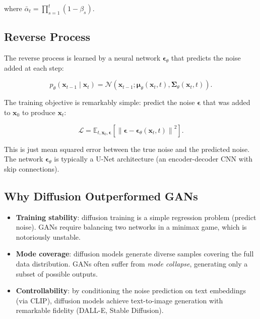 \documentclass[12pt]{article}
\begin{document}
where $\bar{\alpha}_t = \prod_{s=1}^t (1 - \beta_s)$.

\subsection{Reverse Process}

The reverse process is learned by a neural network $\boldsymbol{\epsilon}_\theta$ that predicts the noise added at each step:

\begin{equation}
    p_\theta(\mathbf{x}_{t-1} \mid \mathbf{x}_t) = \mathcal{N}(\mathbf{x}_{t-1}; \boldsymbol{\mu}_\theta(\mathbf{x}_t, t), \boldsymbol{\Sigma}_\theta(\mathbf{x}_t, t)).
    \label{t13eq:reverse}
\end{equation}

The training objective is remarkably simple: predict the noise $\boldsymbol{\epsilon}$ that was added to $\mathbf{x}_0$ to produce $\mathbf{x}_t$:

\begin{equation}
    \mathcal{L} = \mathbb{E}_{t, \mathbf{x}_0, \boldsymbol{\epsilon}} \left[ \left\| \boldsymbol{\epsilon} - \boldsymbol{\epsilon}_\theta(\mathbf{x}_t, t) \right\|^2 \right].
    \label{t13eq:diffusion_loss}
\end{equation}

This is just mean squared error between the true noise and the predicted noise. The network $\boldsymbol{\epsilon}_\theta$ is typically a U-Net architecture (an encoder-decoder CNN with skip connections).

\subsection{Why Diffusion Outperformed GANs}

\begin{itemize}
    \item \textbf{Training stability}: diffusion training is a simple regression problem (predict noise). GANs require balancing two networks in a minimax game, which is notoriously unstable.
    \item \textbf{Mode coverage}: diffusion models generate diverse samples covering the full data distribution. GANs often suffer from \textit{mode collapse}, generating only a subset of possible outputs.
    \item \textbf{Controllability}: by conditioning the noise prediction on text embeddings (via CLIP), diffusion models achieve text-to-image generation with remarkable fidelity (DALL-E, Stable Diffusion).
\end{itemize}
\end{document}
